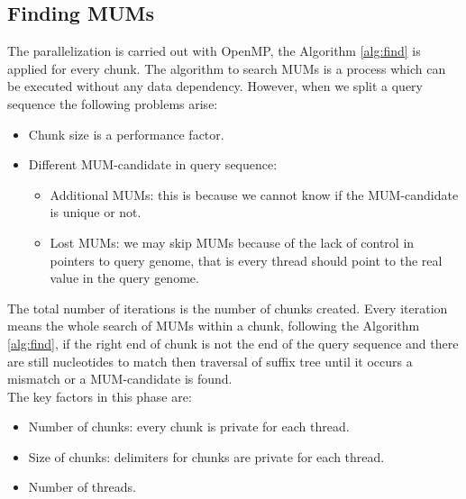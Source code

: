 \documentclass[3p,times]{elsarticle}
\begin{document}
\subsection*{Finding MUMs}
The parallelization is carried out with OpenMP, the Algorithm \ref{alg:find} is applied for every chunk. The algorithm to search MUMs is a process which can be executed without any data dependency. However, when we split a query sequence the following problems arise:
\begin{itemize}
  \item Chunk size is a performance factor.
  \item Different MUM-candidate in query sequence:
    \begin{itemize}
      \item Additional MUMs: this is because we cannot know if the MUM-candidate is unique or not.
      \item Lost MUMs: we may skip MUMs because of the lack of control in pointers to query genome, that is every thread should point to the real value in the query genome.
    \end{itemize}
\end{itemize}
The total number of iterations is the number of chunks created. Every iteration means the whole search of MUMs within a chunk, following the Algorithm \ref{alg:find}, if the right end of chunk is not the end of the query sequence and there are still nucleotides to match then traversal of suffix tree until it occurs a mismatch or a MUM-candidate is found.\\
The key factors in this phase are:
\begin{itemize}
  \item Number of chunks: every chunk is private for each thread.
  \item Size of chunks: delimiters for chunks are private for each thread.
  \item Number of threads.
\end{itemize}
\end{document}

